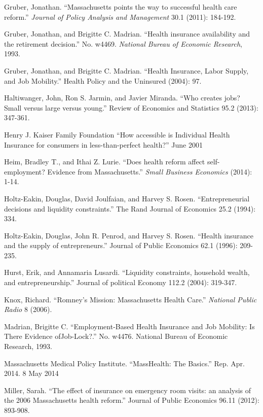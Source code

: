 \documentclass[12pt]{article}
\begin{document}
\begin{thebibliography}{99}
Gruber, Jonathan. ``Massachusetts points the way to successful health care reform.'' \emph{Journal of Policy Analysis and Management} 30.1 (2011): 184-192.

Gruber, Jonathan, and Brigitte C. Madrian. ``Health insurance availability and the retirement decision.'' No. w4469. \emph{National Bureau of Economic Research}, 1993.

Gruber, Jonathan, and Brigitte C. Madrian. ``Health Insurance, Labor Supply, and Job Mobility.'' Health Policy and the Uninsured (2004): 97.

Haltiwanger, John, Ron S. Jarmin, and Javier Miranda. ``Who creates jobs? Small versus large versus young.'' Review of Economics and Statistics 95.2 (2013): 347-361.

Henry J. Kaiser Family Foundation ``How accessible is Individual Health Insurance for consumers in less-than-perfect health?'' June 2001

Heim, Bradley T., and Ithai Z. Lurie. ``Does health reform affect self-employment? Evidence from Massachusetts.'' \emph{Small Business Economics} (2014): 1-14.

Holtz-Eakin, Douglas, David Joulfaian, and Harvey S. Rosen. ``Entrepreneurial decisions and liquidity constraints.'' The Rand Journal of Economics 25.2 (1994): 334.

Holtz-Eakin, Douglas, John R. Penrod, and Harvey S. Rosen. ``Health insurance and the supply of entrepreneurs.'' Journal of Public Economics 62.1 (1996): 209-235.

Hurst, Erik, and Annamaria Lusardi. ``Liquidity constraints, household wealth, and entrepreneurship.'' Journal of political Economy 112.2 (2004): 319-347.

Knox, Richard. ``Romney's Mission: Massachusetts Health Care.'' \emph{National Public Radio} 8 (2006).

Madrian, Brigitte C. ``Employment-Based Health Insurance and Job Mobility: Is There Evidence ofJob-Lock?.'' No. w4476. National Bureau of Economic Research, 1993.

Massachusetts Medical Policy Institute. ``MassHealth: The Basics.'' Rep. Apr. 2014. 8 May 2014 

Miller, Sarah. ``The effect of insurance on emergency room visits: an analysis of the 2006 Massachusetts health reform.'' Journal of Public Economics 96.11 (2012): 893-908.


\end{thebibliography}
\end{document}
